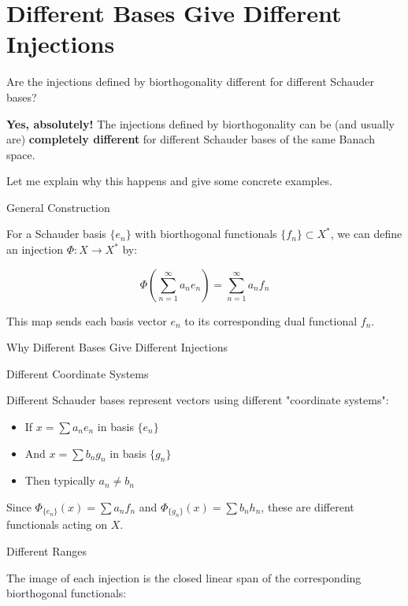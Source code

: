 \documentclass[aps,preprint]{revtex4}
\newenvironment{question}
  {\begin{tcolorbox}[colback=blue!5!white,colframe=blue!75!black,title=Question]}
  {\end{tcolorbox}}
\newenvironment{answer}
  {\begin{tcolorbox}[colback=green!5!white,colframe=green!75!black,title=Answer]}
  {\end{tcolorbox}}
\begin{document}
\section{Different Bases Give Different Injections \label{10/30/2025}}

\begin{question}
Are the injections defined by biorthogonality different for different
Schauder bases?
\end{question}

\begin{answer}
\textbf{Yes, absolutely!} The injections defined by biorthogonality can be
(and usually are) \textbf{completely different} for different Schauder bases
of the same Banach space.

Let me explain why this happens and give some concrete examples.

General Construction

For a Schauder basis $\{e_n\}$ with biorthogonal functionals $\{f_n\}
\subset X^*$, we can define an injection $\Phi: X \to X^*$ by:

\begin{equation*}
\Phi\left(\sum_{n=1}^\infty a_n e_n\right) = \sum_{n=1}^\infty a_n f_n
\end{equation*}

This map sends each basis vector $e_n$ to its corresponding dual functional $%
f_n$.

Why Different Bases Give Different Injections

Different Coordinate Systems

Different Schauder bases represent vectors using different "coordinate
systems":

\begin{itemize}
\item If $x = \sum a_n e_n$ in basis $\{e_n\}$

\item And $x = \sum b_n g_n$ in basis $\{g_n\}$

\item Then typically $a_n \neq b_n$
\end{itemize}

Since $\Phi_{\{e_n\}}(x) = \sum a_n f_n$ and $\Phi_{\{g_n\}}(x) = \sum b_n
h_n$, these are different functionals acting on $X$.

Different Ranges

The image of each injection is the closed linear span of the corresponding
biorthogonal functionals:


\end{answer}
\end{document}
